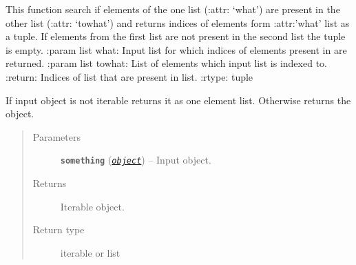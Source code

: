 \documentclass[a4paper,10pt,english]{sphinxmanual}
\begin{document}

\begin{fulllineitems}
\label{aqueduct.utils.helpers:aqueduct.utils.helpers.what2what}
This function search if elements of the one list (:attr: `what') are present in the other list (:attr: `towhat') and returns indices of elements form :attr:'what' list as a tuple.
If elements from the first list are not present in the second list the tuple is empty.
:param list what: Input list for which indices of elements present in  are returned.
:param list towhat: List of elements which input list is indexed to.
:return: Indices of  list that are present in  list.
:rtype: tuple

\end{fulllineitems}


\begin{fulllineitems}
\label{aqueduct.utils.helpers:aqueduct.utils.helpers.make_iterable}
If input object is not iterable returns it as one element list. Otherwise returns the object.
\begin{quote}\begin{description}
\item[{Parameters}] \leavevmode
\textbf{\texttt{something}} (\href{https://docs.python.org/2/library/functions.html\#object}{\emph{\texttt{object}}}) -- Input object.

\item[{Returns}] \leavevmode
Iterable object.

\item[{Return type}] \leavevmode
iterable or list

\end{description}\end{quote}

\end{fulllineitems}


\begin{fulllineitems}
\label{aqueduct.utils.helpers:aqueduct.utils.helpers.strech_zip}
\end{fulllineitems}
\end{document}
